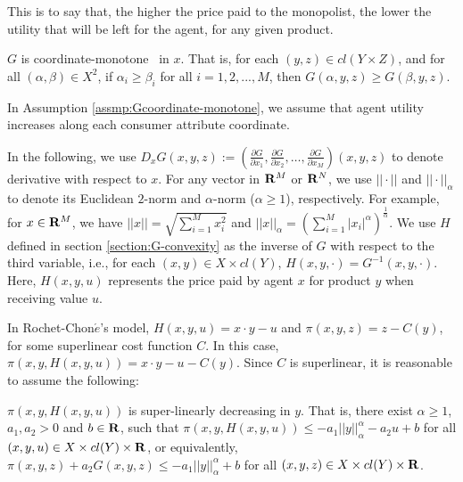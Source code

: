 This is to say that, the higher the price paid to the monopolist, the lower the utility that will be left for the agent, for any given product. %
\medskip


\begin{assumption}\label{assmp:Gcoordinate-monotone}
	$G$ is coordinate-monotone
	~in $x$. That is, for each $(y,z)\in cl(Y\times Z)$, and for all $ (\alpha, \beta) \in X^2$, if $\alpha_i\ge \beta_i$ for all $ i=1,2,...,M$, then $G(\alpha,y,z)\ge G(\beta, y,z)$.
\end{assumption}


In Assumption \ref{assmp:Gcoordinate-monotone}, we assume that agent utility increases along each consumer attribute coordinate.\medskip



 {In the following, we use  $D_x G(x,y,z) := (\frac{\partial G}{\partial x_1}, \frac{\partial G}{\partial x_2}, \dots, \frac{\partial G}{\partial x_M})(x,y,z)$ to denote derivative with respect to $x$. For any vector in ${\mathbf R}^M$ or ${\mathbf R}^N$, we use $||\cdot||$ and $||\cdot||_{\alpha}$ to denote its Euclidean  $2$-norm and $\alpha$-norm ($\alpha \ge 1$), respectively. For example, for $x\in {\mathbf R}^M$, we have $||x|| = \sqrt{\sum_{i=1}^{M} x_i^2}$ and $||x||_{\alpha} = (\sum_{i=1}^{M} |x_i|^{\alpha})^{\frac{1}{\alpha}}$. 
 We use $H$ defined in section \ref{section:G-convexity} as the inverse of $G$ with respect to the third variable, i.e., for each $(x, y) \in X\times cl(Y)$, $H(x, y, \cdot)= G^{-1}(x,y,\cdot)$. Here, $H(x,y,u)$ represents the price paid by agent $x$ for product $y$ when receiving value $u$.}\medskip

In Rochet-Chon$\acute{e}$'s model, $H(x,y,u) = x\cdot y -u$ and $\pi(x,y,z) = z-C(y)$, for some superlinear cost function $C$. In this case, $\pi(x,y,H(x,y,u)) = x\cdot y -u -C(y)$. Since $C$ is superlinear, it is reasonable to assume the following:\medskip


\begin{assumption}\label{assmp:Gtech0}
	$\pi(x,y,H(x,y,u))$ is super-linearly decreasing in $y$. That is, there exist $\alpha \ge 1$, $a_1, a_2> 0$ and $b\in {\mathbf R}$, such that $\pi(x,y,H(x,y,u)) \le -a_1 ||y||_{\alpha}^{\alpha} - a_2 u +b$ for all $ (x, y, u)\in X\times cl(Y)\times {\mathbf R}$, or equivalently, $\pi(x,y,z) + a_2 G(x,y,z) \le -a_1 ||y||_{\alpha}^{\alpha}  +b$ for all $ (x, y, z)\in X\times cl(Y)\times {\mathbf R}$.
\end{assumption}


